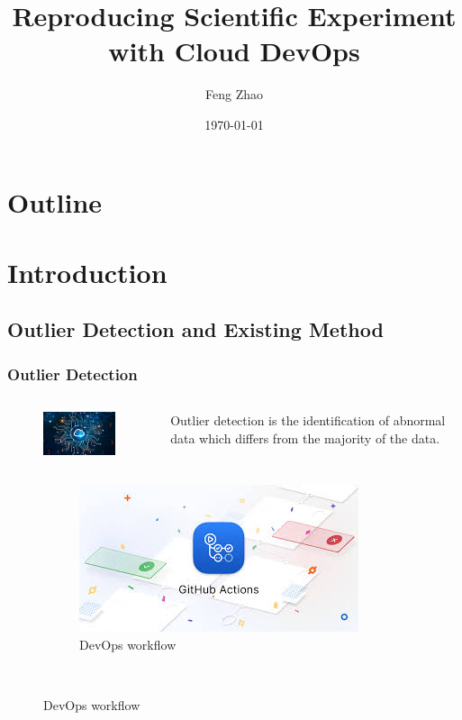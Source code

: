 \documentclass[notheorems]{beamer}
\title{Reproducing Scientific Experiment with Cloud DevOps}
\author{Feng Zhao}
\date{\today}
\begin{document}
\begin{frame}
	\titlepage
\end{frame}
\section*{Outline}
\begin{frame}
	\tableofcontents
\end{frame}

\section{Introduction}
\subsection{Outlier Detection and Existing Method}
\begin{frame}
\frametitle{Outlier Detection}
	\begin{columns}
		\column{5cm}
		\begin{figure}
			\includegraphics[width=4cm]{pic/cloud_computing.jpeg}
		\end{figure}
		\column{5cm}
		Outlier detection is the identification of abnormal data which differs from the majority of the data.
	\end{columns}
\begin{figure}
	\centering
	\begin{subfigure}{0.33\textwidth}
		\includegraphics[width=\textwidth]{pic/github_actions.jpg}
		\caption{DevOps workflow}
	\end{subfigure}~~~~~

\end{figure}
\end{frame}
\end{document}
